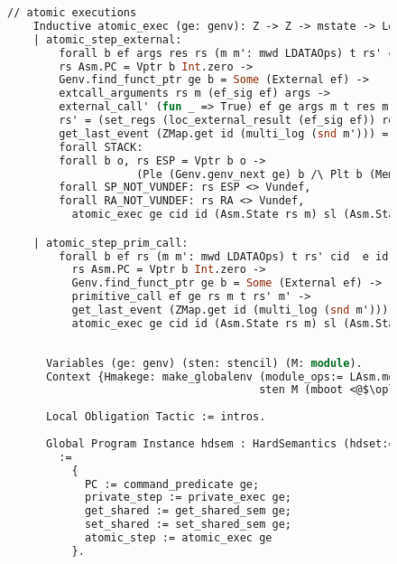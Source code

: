 \begin{figure}
\begin{lstlisting}[language=Caml]
    // atomic executions 
    Inductive atomic_exec (ge: genv): Z -> Z -> mstate -> Log -> mstate -> OtherEvent -> Prop :=
    | atomic_step_external:
        forall b ef args res rs (m m': mwd LDATAOps) t rs' cid e id sl,
        rs Asm.PC = Vptr b Int.zero ->
        Genv.find_funct_ptr ge b = Some (External ef) ->
        extcall_arguments rs m (ef_sig ef) args ->
        external_call' (fun _ => True) ef ge args m t res m' ->
        rs' = (set_regs (loc_external_result (ef_sig ef)) res (undef_regs (CR ZF :: CR CF :: CR PF :: CR SF :: CR OF :: nil) (undef_regs (map preg_of destroyed_at_call) rs))) #Asm.PC <- (rs RA) #RA <- Vundef ->
        get_last_event (ZMap.get id (multi_log (snd m'))) = Some e ->
        forall STACK:
        forall b o, rs ESP = Vptr b o ->
                    (Ple (Genv.genv_next ge) b /\ Plt b (Mem.nextblock m)),
        forall SP_NOT_VUNDEF: rs ESP <> Vundef,
        forall RA_NOT_VUNDEF: rs RA <> Vundef,
          atomic_exec ge cid id (Asm.State rs m) sl (Asm.State rs' m') e

    | atomic_step_prim_call:
        forall b ef rs (m m': mwd LDATAOps) t rs' cid  e id sl,
          rs Asm.PC = Vptr b Int.zero ->
          Genv.find_funct_ptr ge b = Some (External ef) ->
          primitive_call ef ge rs m t rs' m' ->
          get_last_event (ZMap.get id (multi_log (snd m'))) = Some e ->
          atomic_exec ge cid id (Asm.State rs m) sl (Asm.State rs' m') e.
\end{lstlisting}
\end{figure}

\begin{figure}
\begin{lstlisting}[language=Caml]
      
      Variables (ge: genv) (sten: stencil) (M: module).
      Context {Hmakege: make_globalenv (module_ops:= LAsm.module_ops) (mkp_ops:= make_program_ops) 
                                       sten M (mboot <@$\oplus$@> L64) = ret ge}.
      
      Local Obligation Tactic := intros.
      
      Global Program Instance hdsem : HardSemantics (hdset:= hdseting)
        :=
          {
            PC := command_predicate ge;
            private_step := private_exec ge;
            get_shared := get_shared_sem ge;
            set_shared := set_shared_sem ge;
            atomic_step := atomic_exec ge
          }.
\end{lstlisting}
\end{figure}


